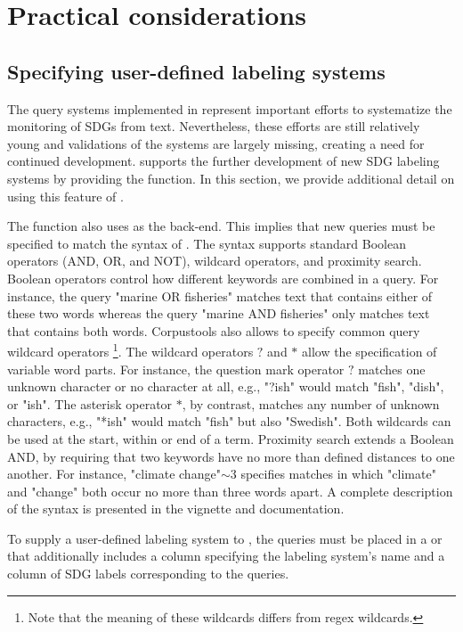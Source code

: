 \section{Practical considerations}

\subsection{Specifying user-defined labeling systems}

 The query systems implemented in  represent important efforts to systematize the monitoring of SDGs from text. Nevertheless, these efforts are still relatively young and validations of the systems are largely missing, creating a need for continued development.  supports the further development of new SDG labeling systems by providing the  function. In this section, we provide additional detail on using this feature of .  

 The  function also uses  as the back-end. This implies that new queries must be specified to match the syntax of . The syntax supports standard Boolean operators (AND, OR, and NOT), wildcard operators, and proximity search. Boolean operators control how different keywords are combined in a query. For instance, the query "marine OR fisheries" matches text that contains either of these two words whereas the query "marine AND fisheries" only matches text that contains both words. Corpustools also allows to specify common query wildcard operators \footnote{Note that the meaning of these wildcards differs from regex wildcards.}. The wildcard operators $?$ and $*$ allow the specification of variable word parts. For instance, the question mark operator $?$ matches one unknown character or no character at all, e.g., "?ish" would match "fish", "dish", or "ish". The asterisk operator $*$, by contrast, matches any number of unknown characters, e.g., "*ish" would match "fish" but also "Swedish". Both wildcards can be used at the start, within or end of a term. Proximity search extends a Boolean AND, by requiring that two keywords have no more than defined distances to one another. For instance, "climate change"$\sim$3 specifies matches in which "climate" and "change" both occur no more than three words apart. A complete description of the  syntax is presented in the  vignette and documentation. 

 To supply a user-defined labeling system to , the queries must be placed in a  or  that additionally includes a column specifying the labeling system's name and a column of SDG labels corresponding to the queries. 
 
